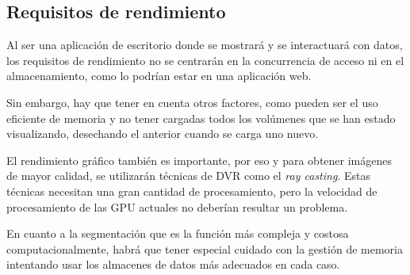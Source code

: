 \subsection{Requisitos de rendimiento}

Al ser una aplicación de escritorio donde se mostrará y se interactuará con datos, los requisitos de rendimiento no se centrarán en la concurrencia de acceso ni en el almacenamiento, como lo podrían estar en una aplicación web.

Sin embargo, hay que tener en cuenta otros factores, como pueden ser el uso eficiente de memoria y no tener cargadas todos los volúmenes que se han estado visualizando, desechando el anterior cuando se carga uno nuevo.

El rendimiento gráfico también es importante, por eso y para obtener imágenes de mayor calidad, se utilizarán técnicas de DVR como el \textit{ray casting}. Estas técnicas necesitan una gran cantidad de procesamiento, pero la velocidad de procesamiento de las GPU actuales no deberían resultar un problema.

En cuanto a la segmentación que es la función más compleja y costosa computacionalmente, habrá que tener especial cuidado con la gestión de memoria intentando usar los almacenes de datos más adecuados en cada caso.
